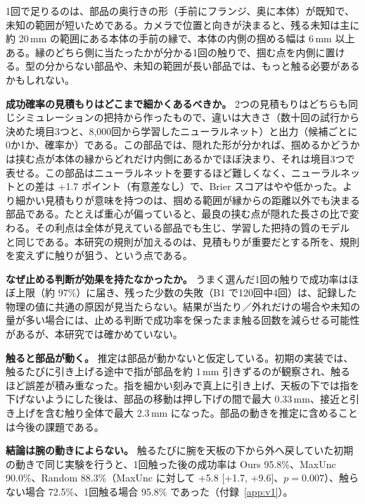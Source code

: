 \documentclass[conference]{IEEEtran}
\newcommand{\Ours}{Ours}
\newcommand{\Unc}{MaxUnc}
\newcommand{\Rand}{Random}
\begin{document}
1回で足りるのは、部品の奥行きの形（手前にフランジ、奥に本体）が既知で、未知の範囲が短いためである。カメラで位置と向きが決まると、残る未知は主に約 20\,mm の範囲にある本体の手前の縁で、本体の内側の掴める幅は 6\,mm 以上ある。縁のどちら側に当たったかが分かる1回の触りで、掴む点を内側に置ける。型の分からない部品や、未知の範囲が長い部品では、もっと触る必要があるかもしれない。

\textbf{成功確率の見積もりはどこまで細かくあるべきか。} 2つの見積もりはどちらも同じシミュレーションの把持から作ったもので、違いは大きさ（数十回の試行から決めた境目3つと、8,000回から学習したニューラルネット）と出力（候補ごとに0か1か、確率か）である。この部品では、隠れた形が分かれば、掴めるかどうかは挟む点が本体の縁からどれだけ内側にあるかでほぼ決まり、それは境目3つで表せる。この部品はニューラルネットを要するほど難しくなく、ニューラルネットとの差は +1.7 ポイント（有意差なし）で、Brier スコアはやや低かった。より細かい見積もりが意味を持つのは、掴める範囲が縁からの距離以外でも決まる部品である。たとえば重心が偏っていると、最良の挟む点が隠れた長さの比で変わる。その利点は全体が見えている部品でも生じ、学習した把持の質のモデル~\cite{mahler2017dexnet2} と同じである。本研究の規則が加えるのは、見積もりが重要だとする所を、規則を変えずに触りが狙う、という点である。

\textbf{なぜ止める判断が効果を持たなかったか。} うまく選んだ1回の触りで成功率はほぼ上限（約 97\%）に届き、残った少数の失敗（B1 で120回中4回）は、記録した物理の値に共通の原因が見当たらない。結果が当たり／外れだけの場合や未知の量が多い場合には、止める判断で成功率を保ったまま触る回数を減らせる可能性があるが、本研究では確かめていない。

\textbf{触ると部品が動く。} 推定は部品が動かないと仮定している。初期の実装では、触るたびに引き上げる途中で指が部品を約 1\,mm 引きずるのが観察され、触るほど誤差が積み重なった。指を細かい刻みで真上に引き上げ、天板の下では指を下げないようにした後は、部品の移動は押し下げの間で最大 0.33\,mm、接近と引き上げを含む触り全体で最大 2.3\,mm になった。部品の動きを推定に含めることは今後の課題である。

\textbf{結論は腕の動きによらない。} 触るたびに腕を天板の下から外へ戻していた初期の動きで同じ実験を行うと、1回触った後の成功率は \Ours{} 95.8\%、\Unc{} 90.0\%、\Rand{} 88.3\%（\Unc{} に対して +5.8 [+1.7, +9.6]、$p=0.007$）、触らない場合 72.5\%、1回触る場合 95.8\% であった（付録~\ref{app:v1}）。
\end{document}
